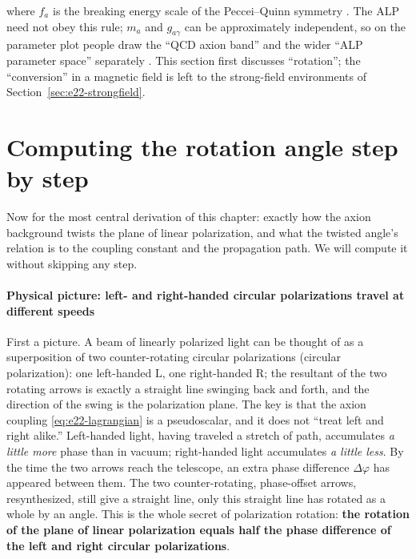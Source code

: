where \(f_a\) is the breaking energy scale of the Peccei--Quinn symmetry \citep{1977PhRvL..38.1440P,1978PhRvL..40..223W,1978PhRvL..40..279W}. The ALP need not obey this rule; \(m_a\) and \(g_{a\gamma}\) can be approximately independent, so on the parameter plot people draw the ``QCD axion band'' and the wider ``ALP parameter space'' separately \citep{2016PhR...643....1M,2014JHEP...06..037D,1983PhRvL..51.1415S}. This section first discusses ``rotation''; the ``conversion'' in a magnetic field is left to the strong-field environments of Section~\ref{sec:e22-strongfield}.


\section{Computing the rotation angle step by step}
\label{sec:e22-rotation}

Now for the most central derivation of this chapter: exactly how the axion background twists the plane of linear polarization, and what the twisted angle's relation is to the coupling constant and the propagation path. We will compute it without skipping any step.

\paragraph{Physical picture: left- and right-handed circular polarizations travel at different speeds}

First a picture. A beam of linearly polarized light can be thought of as a superposition of two counter-rotating circular polarizations (circular polarization): one left-handed \(\mathrm L\), one right-handed \(\mathrm R\); the resultant of the two rotating arrows is exactly a straight line swinging back and forth, and the direction of the swing is the polarization plane. The key is that the axion coupling \eqref{eq:e22-lagrangian} is a pseudoscalar, and it does not ``treat left and right alike.'' Left-handed light, having traveled a stretch of path, accumulates \emph{a little more} phase than in vacuum; right-handed light accumulates \emph{a little less}. By the time the two arrows reach the telescope, an extra phase difference \(\Delta\varphi\) has appeared between them. The two counter-rotating, phase-offset arrows, resynthesized, still give a straight line, only this straight line has rotated as a whole by an angle. This is the whole secret of polarization rotation: \textbf{the rotation of the plane of linear polarization equals half the phase difference of the left and right circular polarizations}.

